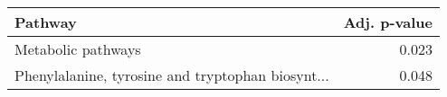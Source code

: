 \begin{tabular}{lr}
\toprule
                                           Pathway &  Adj. p-value \\
\midrule
                                Metabolic pathways &         0.023 \\
 Phenylalanine, tyrosine and tryptophan biosynt... &         0.048 \\
\bottomrule
\end{tabular}

